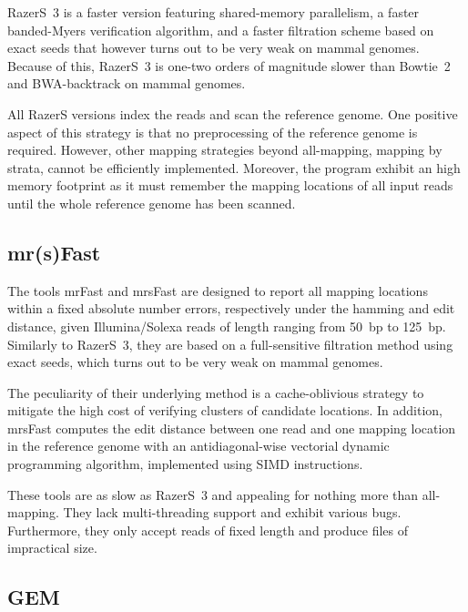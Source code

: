 RazerS~3 \citep{Weese2012} is a faster version featuring shared-memory parallelism, a faster banded-Myers verification algorithm, and a faster filtration scheme based on exact seeds that however turns out to be very weak on mammal genomes.
Because of this, RazerS~3 is one-two orders of magnitude slower than Bowtie~2 and BWA-backtrack on mammal genomes.

All RazerS versions index the reads and scan the reference genome.
One positive aspect of this strategy is that no preprocessing of the reference genome is required.
However, other mapping strategies beyond all-mapping, \eg mapping by strata, cannot be efficiently implemented.
Moreover, the program exhibit an high memory footprint as it must remember the mapping locations of all input reads until the whole reference genome has been scanned.


\subsection{mr(s)Fast}

The tools mrFast \citep{Ahmadi2012} and mrsFast \citep{Hach2010} are designed to report all mapping locations within a fixed absolute number errors, respectively under the hamming and edit distance, given Illumina/Solexa reads of length ranging from 50~bp to 125~bp.
Similarly to RazerS~3, they are based on a full-sensitive filtration method using exact seeds, which turns out to be very weak on mammal genomes.

The peculiarity of their underlying method is a cache-oblivious strategy to mitigate the high cost of verifying clusters of candidate locations.
In addition, mrsFast computes the edit distance between one read and one mapping location in the reference genome with an antidiagonal-wise vectorial dynamic programming algorithm, implemented using SIMD instructions.

These tools are as slow as RazerS~3 and appealing for nothing more than all-mapping.
They lack multi-threading support and exhibit various bugs.
Furthermore, they only accept reads of fixed length and produce files of impractical size.


\subsection{GEM}

